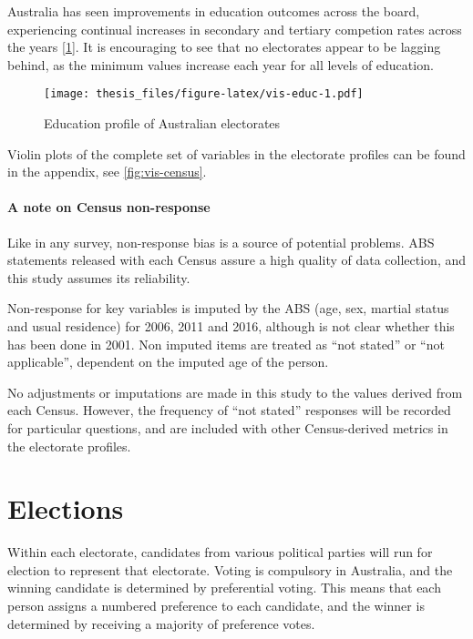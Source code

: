 \documentclass{monashthesis}
\theoremstyle{definition}
\theoremstyle{definition}
\theoremstyle{definition}
\theoremstyle{remark}
\begin{document}
Australia has seen improvements in education outcomes across the board,
experiencing continual increases in secondary and tertiary competion
rates across the years {[}\ref{fig:vis-educ}{]}. It is encouraging to
see that no electorates appear to be lagging behind, as the minimum
values increase each year for all levels of education.

\begin{figure}
\centering
\texttt{[image: thesis\_files/figure-latex/vis-educ-1.pdf]}
\caption{\label{fig:vis-educ}Education profile of Australian electorates}
\end{figure}

Violin plots of the complete set of variables in the electorate profiles
can be found in the appendix, see \ref{fig:vis-census}.

\paragraph{A note on Census
non-response}\label{a-note-on-census-non-response}

Like in any survey, non-response bias is a source of potential problems.
ABS statements released with each Census assure a high quality of data
collection, and this study assumes its reliability.

Non-response for key variables is imputed by the ABS (age, sex, martial
status and usual residence) for 2006, 2011 and 2016, although is not
clear whether this has been done in 2001. Non imputed items are treated
as ``not stated'' or ``not applicable'', dependent on the imputed age of
the person.

No adjustments or imputations are made in this study to the values
derived from each Census. However, the frequency of ``not stated''
responses will be recorded for particular questions, and are included
with other Census-derived metrics in the electorate profiles.

\section{Elections}\label{elections}

Within each electorate, candidates from various political parties will
run for election to represent that electorate. Voting is compulsory in
Australia, and the winning candidate is determined by preferential
voting. This means that each person assigns a numbered preference to
each candidate, and the winner is determined by receiving a majority of
preference votes.
\end{document}
